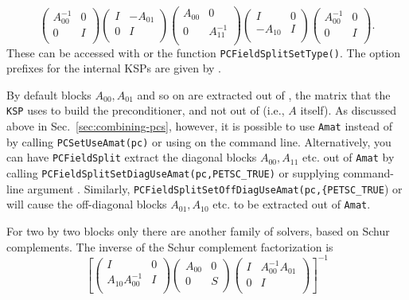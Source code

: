 \[
\left( \begin{array}{cc}
A_{00}^{-1}   & 0 \\
0 & I \\
\end{array} \right)
\left( \begin{array}{cc}
I   & -A_{01} \\
0 & I \\
\end{array} \right)
\left( \begin{array}{cc}
A_{00}   & 0 \\
0 & A_{11}^{-1} \\
\end{array} \right)
\left( \begin{array}{cc}
I   & 0 \\
-A_{10} & I \\
\end{array} \right)
\left( \begin{array}{cc}
A_{00}^{-1}   & 0 \\
0 & I \\
\end{array} \right).
\]
These can be accessed with \break{}  or the function \lstinline{PCFieldSplitSetType()}. The option prefixes for the internal KSPs are given by .

By default blocks $A_{00}, A_{01}$ and so on are extracted out of , the matrix that the \lstinline{KSP} uses to build the preconditioner,
and not out of  (i.e., $A$ itself). As discussed above in Sec.~\ref{sec:combining-pcs}, however, it is possible to use \lstinline{Amat}
instead of  by calling \lstinline{PCSetUseAmat(pc)} or using  on the command line.  Alternatively, you can have \lstinline{PCFieldSplit}
extract the diagonal blocks $A_{00}, A_{11}$ etc. out of \lstinline{Amat} by calling \lstinline{PCFieldSplitSetDiagUseAmat(pc,PETSC_TRUE)} or supplying
command-line argument .  Similarly, \break\lstinline{PCFieldSplitSetOffDiagUseAmat(pc,{PETSC_TRUE}) or 
will cause the off-diagonal blocks $A_{01},A_{10}$ etc. to be extracted out of \lstinline{Amat}.

For two by two blocks only there are another family of solvers, based on Schur complements. The inverse of the Schur complement factorization is
\[
\left[
\left( \begin{array}{cc}
I   & 0 \\
A_{10}A_{00}^{-1} & I \\
\end{array} \right)
\left( \begin{array}{cc}
A_{00}  & 0 \\
0 & S \\
\end{array} \right)
\left( \begin{array}{cc}
I   & A_{00}^{-1} A_{01} \\
0 & I \\
\end{array} \right)
\right]^{-1}
\]



